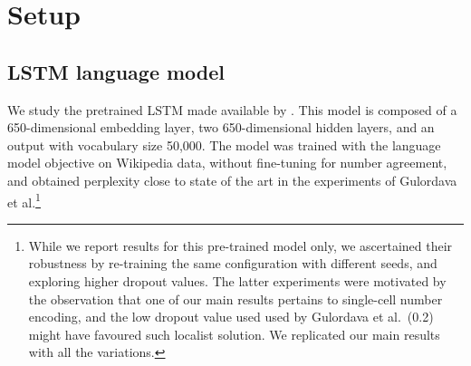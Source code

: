 
\section{Setup}


\subsection{LSTM language model}\label{ssec:lstm_lm}
We study the pretrained LSTM made available by
.  This model is composed of a
650-dimensional embedding layer, two 650-dimensional hidden layers,
and an output with vocabulary size 50,000. 
The model was trained with the language
model objective on Wikipedia data, without fine-tuning for number
agreement, and obtained perplexity close to state of the art in the experiments of Gulordava et al.\footnote{While we report results for this pre-trained model
  only, we ascertained their robustness by re-training the same
  configuration with different seeds, and exploring higher dropout
  values. The latter experiments were motivated by the observation
  that one of our main results pertains to single-cell number
  encoding, and the low dropout value used used by Gulordava et
  al.~(0.2) might have favoured such localist solution. We replicated
  our main results with all the variations.} 



